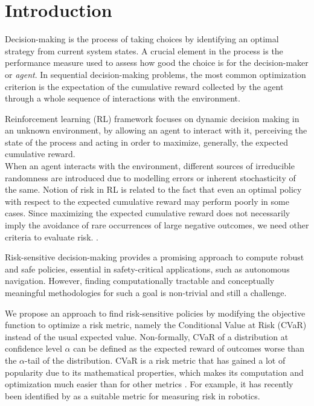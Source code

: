 \chapter{Introduction}
\label{sec:introduction}


Decision-making is the process of taking choices by identifying an optimal strategy
from current system states. A crucial element in the process is the performance measure used
to assess how good the choice is for the decision-maker or \textit{agent}.
In sequential decision-making problems, the most common optimization criterion is the 
expectation of the cumulative reward collected by the agent through a whole sequence
of interactions with the environment.


Reinforcement learning (RL) framework focuses on dynamic decision making in an unknown environment, by
allowing an agent to interact with it, perceiving the state of the process and acting in order to
maximize, generally, the expected cumulative reward.\\
When an agent interacts with the environment, different sources of irreducible 
randomness are introduced due to modelling errors or inherent stochasticity of the same.
Notion of risk in RL is related to the fact that even an optimal policy with respect to the 
expected cumulative reward may perform poorly in some cases.
Since maximizing the expected cumulative reward does not necessarily imply the avoidance of rare occurrences of large negative outcomes,
we need other criteria to evaluate risk. \citep{Garcia2015}.

Risk-sensitive decision-making provides a promising
approach to compute robust and safe policies, essential in safety-critical applications,
such as autonomous navigation.
However, finding computationally tractable and conceptually meaningful methodologies for such a
goal is non-trivial and still a challenge.

We propose an approach to find risk-sensitive policies by modifying the
objective function to optimize a risk metric, namely the Conditional Value at Risk (CVaR)
instead of the usual expected value.
Non-formally, CVaR of a distribution at confidence level $\alpha$ can be defined as the expected
reward of outcomes worse than the $\alpha$-tail of the distribution.
CVaR is a risk metric that has gained a lot of popularity due to its mathematical properties,
which makes its computation and optimization much easier than for other metrics  \citep{Rockafellar2000}. For example, 
it has recently been identified by \citet{Majumdar2020} as a suitable metric
for measuring risk in robotics.

